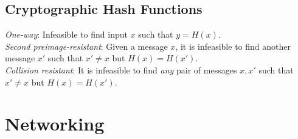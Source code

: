 \documentclass[10pt,landscape]{article}
\begin{document}
\begin{multicols}{3}
\subsection{Cryptographic Hash Functions}

\textit{One-way}: Infeasible to find input $x$ such that $y = H(x)$. \\
\textit{Second preimage-resistant}: Given a message $x$, it is infeasible to find another message $x'$ such that $x' \ne x$ but $H(x) = H(x')$. \\
\textit{Collision resistant}: It is infeasible to find \textit{any} pair of messages $x, x'$ such that $x' \ne x$ but $H(x) = H(x')$. \\



\section{Networking}


\end{multicols}
\end{document}
